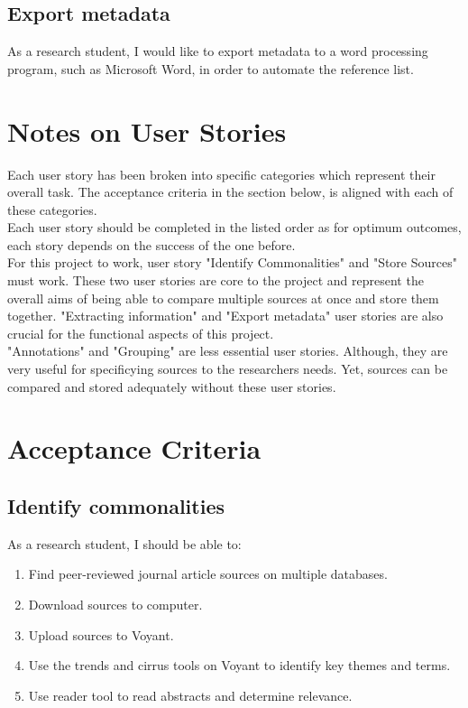 \documentclass{article}
\begin{document}
\subsection{Export metadata}
As a research student, I would like to export metadata to a word processing program, such as Microsoft Word, in order to automate the reference list. 
\section{Notes on User Stories}
Each user story has been broken into specific categories which represent their overall task. The acceptance criteria in the section below, is aligned with each of these categories. \\
Each user story should be completed in the listed order as for optimum outcomes, each story depends on the success of the one before. \\
For this project to work, user story "Identify Commonalities" and "Store Sources" must work. These two user stories are core to the project and represent the overall aims of being able to compare multiple sources at once and store them together. "Extracting information" and "Export metadata" user stories are also crucial for the functional aspects of this project. \\
"Annotations" and "Grouping" are less essential user stories. Although, they are very useful for specificying sources to the researchers needs. Yet, sources can be compared and stored adequately without these user stories.

\section{Acceptance Criteria}
\subsection{Identify commonalities}
As a research student, I should be able to:
\begin{enumerate}
    \item Find peer-reviewed journal article sources on multiple databases.
    \item Download sources to computer.
    \item Upload sources to Voyant.
    \item Use the trends and cirrus tools on Voyant to identify key themes and terms.
    \item Use reader tool to read abstracts and determine relevance.
\end{enumerate}
\end{document}
